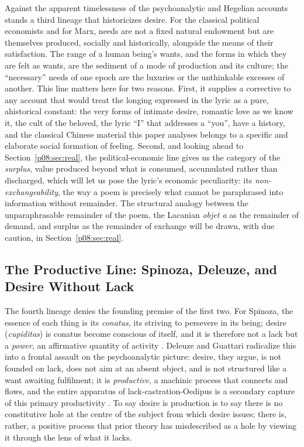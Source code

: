 Against the apparent timelessness of the psychoanalytic and Hegelian accounts stands a third lineage that historicizes desire. For the classical political economists and for Marx, needs are not a fixed natural endowment but are themselves produced, socially and historically, alongside the means of their satisfaction. The range of a human being's wants, and the forms in which they are felt as wants, are the sediment of a mode of production and its culture; the ``necessary'' needs of one epoch are the luxuries or the unthinkable excesses of another. This line matters here for two reasons. First, it supplies a corrective to any account that would treat the longing expressed in the lyric as a pure, ahistorical constant: the very forms of intimate desire, romantic love as we know it, the cult of the beloved, the lyric ``I'' that addresses a ``you'', have a history, and the classical Chinese material this paper analyses belongs to a specific and elaborate social formation of feeling. Second, and looking ahead to Section~\ref{p08:sec:real}, the political-economic line gives us the category of the \emph{surplus}, value produced beyond what is consumed, accumulated rather than discharged, which will let us pose the lyric's economic peculiarity: its \emph{non-exchangeability}, the way a poem is precisely what cannot be paraphrased into information without remainder. The structural analogy between the unparaphrasable remainder of the poem, the Lacanian \textit{objet a} as the remainder of demand, and surplus as the remainder of exchange will be drawn, with due caution, in Section~\ref{p08:sec:real}.

\subsection{The Productive Line: Spinoza, Deleuze, and Desire Without Lack}

The fourth lineage denies the founding premise of the first two. For Spinoza, the essence of each thing is its \emph{conatus}, its striving to persevere in its being; desire (\textit{cupiditas}) is conatus become conscious of itself, and it is therefore not a lack but a \emph{power}, an affirmative quantity of activity \parencite{spinoza1677ethics}. Deleuze and Guattari radicalize this into a frontal assault on the psychoanalytic picture: desire, they argue, is not founded on lack, does not aim at an absent object, and is not structured like a want awaiting fulfilment; it is \emph{productive}, a machinic process that connects and flows, and the entire apparatus of lack-castration-Oedipus is a secondary capture of this primary productivity \parencite{deleuze1972antioedipus}. To say desire is production is to say there is no constitutive hole at the centre of the subject from which desire issues; there is, rather, a positive process that prior theory has misdescribed as a hole by viewing it through the lens of what it lacks.

